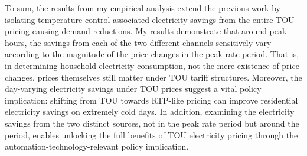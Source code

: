 To sum, the results from my empirical analysis extend the previous work by isolating temperature-control-associated electricity savings from the entire TOU-pricing-causing demand reductions. My results demonstrate that around peak hours, the savings from each of the two different channels sensitively vary according to the magnitude of the price changes in the peak rate period. That is, in determining household electricity consumption, not the mere existence of price changes, prices themselves still matter under TOU tariff structures. Moreover, the day-varying electricity savings under TOU prices suggest a vital policy implication: shifting from TOU towards RTP-like pricing can improve residential electricity savings on extremely cold days. In addition, examining the electricity savings from the two distinct sources, not in the peak rate period but around the period, enables unlocking the full benefits of TOU electricity pricing through the automation-technology-relevant policy implication.

